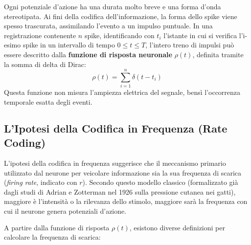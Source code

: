 Ogni potenziale d'azione ha una durata molto breve e una forma d'onda stereotipata. Ai fini della codifica dell'informazione, la forma dello spike viene spesso trascurata, assimilando l'evento a un impulso puntuale. In una registrazione contenente $n$ spike, identificando con $t_i$ l'istante in cui si verifica l'i-esimo spike in un intervallo di tempo $0 \le t \le T$, l'intero treno di impulsi può essere descritto dalla \textbf{funzione di risposta neuronale} $\rho(t)$, definita tramite la somma di delta di Dirac:
\begin{equation}
\rho(t) = \sum_{i=1}^{n} \delta(t - t_i)
\end{equation}
Questa funzione non misura l'ampiezza elettrica del segnale, bensì l'occorrenza temporale esatta degli eventi.

\subsection{L'Ipotesi della Codifica in Frequenza (Rate Coding)}
L'ipotesi della codifica in frequenza suggerisce che il meccanismo primario utilizzato dal neurone per veicolare informazione sia la sua frequenza di scarica (\textit{firing rate}, indicato con $r$). Secondo questo modello classico (formalizzato già dagli studi di Adrian e Zotterman nel 1926 sulla pressione cutanea nei gatti), maggiore è l'intensità o la rilevanza dello stimolo, maggiore sarà la frequenza con cui il neurone genera potenziali d'azione.

A partire dalla funzione di risposta $\rho(t)$, esistono diverse definizioni per calcolare la frequenza di scarica:

